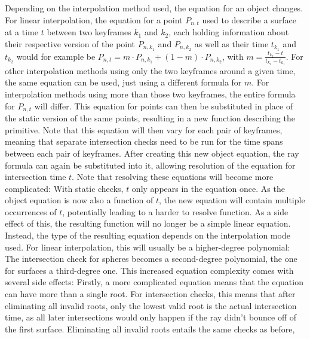 Depending on the interpolation method used, the equation for an object changes.
For linear interpolation,
the equation for a point \(P_{n, t}\) used to describe a surface at a time \(t\) between two keyframes \(k_1\) and \(k_2\),
each holding information about their respective version of the point \(P_{n, k_1}\) and \(P_{n, k_2}\)
as well as their time \(t_{k_1}\) and \(t_{k_2}\)
would for example be \(P_{n, t} = m \cdot P_{n, k_1} + (1-m) \cdot P_{n, k_2}\),
with \(m = \frac{t_{k_2} - t}{t_{k_2} - t_{k_1}}\).
For other interpolation methods using only the two keyframes around a given time,
the same equation can be used, just using a different formula for \(m\).
For interpolation methods using more than those two keyframes,
the entire formula for \(P_{n, t}\) will differ.
\newline
This equation for points can then be substituted in place of the static version of the same points,
resulting in a new function describing the primitive.
Note that this equation will then vary for each pair of keyframes,
meaning that separate intersection checks need to be run for the time spans between each pair of keyframes.
\newline
After creating this new object equation, the ray formula can again be substituted into it,
allowing resolution of the equation for intersection time \(t\).
Note that resolving these equations will become more complicated:
With static checks, \(t\) only appears in the equation once.
As the object equation is now also a function of \(t\),
the new equation will contain multiple occurrences of \(t\),
potentially leading to a harder to resolve function.
\newline
As a side effect of this,
the resulting function will no longer be a simple linear equation.
Instead, the type of the resulting equation depends on the interpolation mode used.
For linear interpolation, this will usually be a higher-degree polynomial:
The intersection check for spheres becomes a second-degree polynomial,
the one for surfaces a third-degree one.
\newline
This increased equation complexity comes with several side effects:
Firstly, a more complicated equation means that the equation can have more than a single root.
For intersection checks, this means that after eliminating all invalid roots,
only the lowest valid root is the actual intersection time,
as all later intersections would only happen if the ray didn't bounce off of the first surface.
\newline
Eliminating all invalid roots entails the same checks as before,
